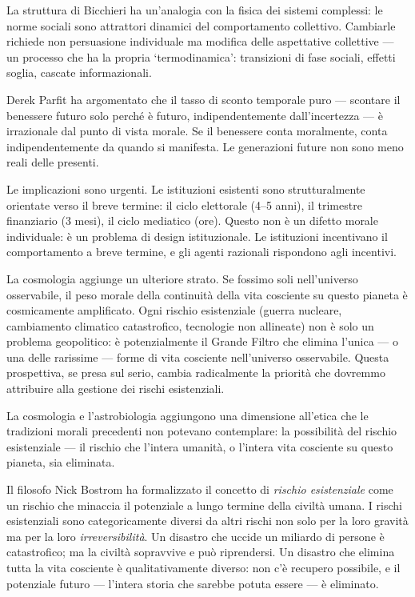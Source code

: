 \documentclass[12pt,a4paper,openany]{book}
\newcommand{\sezione}[1]{\vspace{1.2em}{\large\bfseries #1}\vspace{0.5em}\par}
\begin{document}
La struttura di Bicchieri ha un'analogia con la fisica dei sistemi complessi: le norme sociali sono attrattori dinamici del comportamento collettivo. Cambiarle richiede non persuasione individuale ma modifica delle aspettative collettive — un processo che ha la propria `termodinamica': transizioni di fase sociali, effetti soglia, cascate informazionali.

\sezione{La responsabilità verso il futuro distante}

Derek Parfit ha argomentato che il tasso di sconto temporale puro — scontare il benessere futuro solo perché è futuro, indipendentemente dall'incertezza — è irrazionale dal punto di vista morale. Se il benessere conta moralmente, conta indipendentemente da quando si manifesta. Le generazioni future non sono meno reali delle presenti.

Le implicazioni sono urgenti. Le istituzioni esistenti sono strutturalmente orientate verso il breve termine: il ciclo elettorale (4--5 anni), il trimestre finanziario (3 mesi), il ciclo mediatico (ore). Questo non è un difetto morale individuale: è un problema di design istituzionale. Le istituzioni incentivano il comportamento a breve termine, e gli agenti razionali rispondono agli incentivi.

La cosmologia aggiunge un ulteriore strato. Se fossimo soli nell'universo osservabile, il peso morale della continuità della vita cosciente su questo pianeta è cosmicamente amplificato. Ogni rischio esistenziale (guerra nucleare, cambiamento climatico catastrofico, tecnologie non allineate) non è solo un problema geopolitico: è potenzialmente il Grande Filtro che elimina l'unica — o una delle rarissime — forme di vita cosciente nell'universo osservabile. Questa prospettiva, se presa sul serio, cambia radicalmente la priorità che dovremmo attribuire alla gestione dei rischi esistenziali.

\sezione{L'etica del rischio esistenziale}

La cosmologia e l'astrobiologia aggiungono una dimensione all'etica che le tradizioni morali precedenti non potevano contemplare: la possibilità del rischio esistenziale --- il rischio che l'intera umanità, o l'intera vita cosciente su questo pianeta, sia eliminata.

Il filosofo Nick Bostrom ha formalizzato il concetto di \textit{rischio esistenziale} come un rischio che minaccia il potenziale a lungo termine della civiltà umana. I rischi esistenziali sono categoricamente diversi da altri rischi non solo per la loro gravità ma per la loro \textit{irreversibilità}. Un disastro che uccide un miliardo di persone è catastrofico; ma la civiltà sopravvive e può riprendersi. Un disastro che elimina tutta la vita cosciente è qualitativamente diverso: non c'è recupero possibile, e il potenziale futuro --- l'intera storia che sarebbe potuta essere --- è eliminato.
\end{document}
